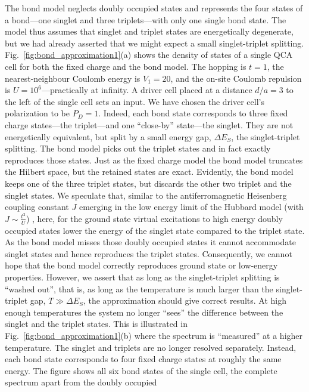 The bond model neglects doubly occupied states and represents the four states of
a bond---one singlet and three triplets---with only one single bond state. The
model thus assumes that singlet and triplet states are energetically degenerate,
but we had already asserted that we might expect a small singlet-triplet
splitting. Fig.~\ref{fig:bond_approximation1}(a) shows the density of states of
a single QCA cell for both the fixed charge and the bond model. The hopping is
$t=1$, the nearest-neighbour Coulomb energy is $V_1 = 20$, and the on-site
Coulomb repulsion is $U = 10^6$---practically at infinity. A driver
cell placed at a distance $d/a = 3$ to the left of the single cell sets an
input. We have chosen the driver cell's polarization to be $P_D = 1$. Indeed, each
bond state corresponds to three fixed charge states---the triplet---and one
``close-by'' state---the singlet. They are not energetically equivalent, but
split by a small energy gap, $\Delta E_S$, the singlet-triplet splitting. The
bond model picks out the triplet states and in fact exactly reproduces those
states. Just as the fixed charge model the bond model truncates the Hilbert
space, but the retained states are exact. Evidently, the bond model keeps one of
the three triplet states, but discards the other two triplet and the singlet
states. We speculate that, similar to the antiferromagnetic Heisenberg coupling
constant $J$ emerging in the low energy limit of the Hubbard model (with $J \sim
\frac{t^2}{U}$) \cite{Auerbach}, here, for the ground state virtual excitations
to high energy doubly occupied states lower the energy of the singlet state
compared to the triplet state. As the bond model misses those doubly occupied
states it cannot accommodate singlet states and hence reproduces the triplet
states. Consequently, we cannot hope that the bond model correctly reproduces
ground state or low-energy properties. However, we assert that as long as the
singlet-triplet splitting is ``washed out'', that is, as long as the temperature
is much larger than the singlet-triplet gap, $T \gg \Delta E_S$, the
approximation should give correct results. At high enough temperatures the
system no longer ``sees'' the difference between the singlet and the triplet
states. This is illustrated in Fig.~\ref{fig:bond_approximation1}(b) where the
spectrum is ``measured'' at a higher temperature. The singlet and triplets are
no longer resolved separately.  Instead, each bond state corresponds to four
fixed charge states at roughly the same energy. The figure shows all six bond
states of the single cell, the complete spectrum apart from the doubly occupied
